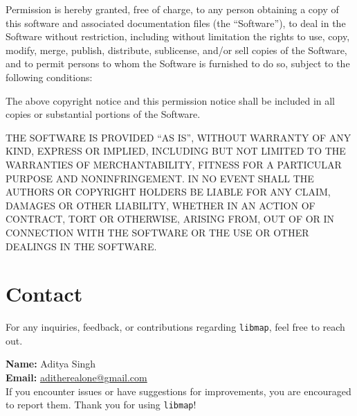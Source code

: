 \documentclass[titlepage]{article}
\begin{document}
Permission is hereby granted, free of charge, to any person obtaining a copy of this software and associated documentation files (the “Software”), to deal in the Software without restriction, including without limitation the rights to use, copy, modify, merge, publish, distribute, sublicense, and/or sell copies of the Software, and to permit persons to whom the Software is furnished to do so, subject to the following conditions:

The above copyright notice and this permission notice shall be included in all copies or substantial portions of the Software.

THE SOFTWARE IS PROVIDED “AS IS”, WITHOUT WARRANTY OF ANY KIND, EXPRESS OR IMPLIED, INCLUDING BUT NOT LIMITED TO THE WARRANTIES OF MERCHANTABILITY, FITNESS FOR A PARTICULAR PURPOSE AND NONINFRINGEMENT. IN NO EVENT SHALL THE AUTHORS OR COPYRIGHT HOLDERS BE LIABLE FOR ANY CLAIM, DAMAGES OR OTHER LIABILITY, WHETHER IN AN ACTION OF CONTRACT, TORT OR OTHERWISE, ARISING FROM, OUT OF OR IN CONNECTION WITH THE SOFTWARE OR THE USE OR OTHER DEALINGS IN THE SOFTWARE.



\newpage
\section{Contact}

For any inquiries, feedback, or contributions regarding \texttt{libmap}, feel free to reach out.

\noindent\textbf{Name:} Aditya Singh \\
\noindent\textbf{Email:} \href{mailto:aditherealone@gmail.com}{aditherealone@gmail.com} \\

If you encounter issues or have suggestions for improvements, you are encouraged to report them. Thank you for using \texttt{libmap}!
\end{document}

